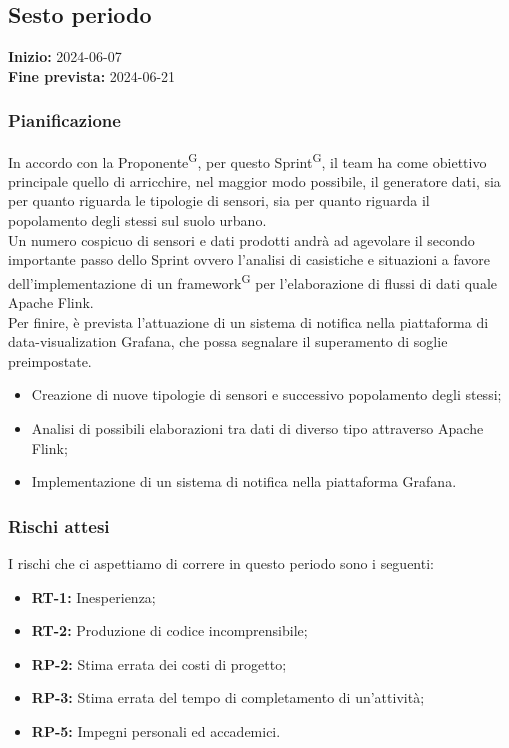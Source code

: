 \documentclass[8pt]{article}
\newcommand{\glossterm}[1]{#1\textsuperscript{G}} %
\begin{document}
\subsection{Sesto periodo} 
\textbf{Inizio:} 2024-06-07\\
\textbf{Fine prevista:} 2024-06-21
\subsubsection{Pianificazione}
In accordo con la \glossterm{Proponente}, per questo \glossterm{Sprint}, il team ha come obiettivo principale quello di arricchire, nel maggior modo possibile, il generatore dati, sia per quanto riguarda le tipologie di sensori, sia per quanto riguarda il popolamento degli stessi sul suolo urbano. \\
Un numero cospicuo di sensori e dati prodotti andrà ad agevolare il secondo importante passo dello Sprint ovvero l'analisi di casistiche e situazioni a favore dell'implementazione di un \glossterm{framework} per l'elaborazione di flussi di dati quale Apache Flink.\\
Per finire, è prevista l'attuazione di un sistema di notifica nella piattaforma di data-visualization Grafana, che possa segnalare il superamento di soglie preimpostate.
\begin{itemize}
    \setlength{\itemsep}{0em}
        \item Creazione di nuove tipologie di sensori e successivo popolamento degli stessi;
        \item Analisi di possibili elaborazioni tra dati di diverso tipo attraverso Apache Flink;
        \item Implementazione di un sistema di notifica nella piattaforma Grafana.
    \end{itemize}

\subsubsection{Rischi attesi}
I rischi che ci aspettiamo di correre in questo periodo sono i seguenti: 
\begin{itemize}
    \setlength{\itemsep}{0em}
        \item \textbf{RT-1:} Inesperienza;
        \item \textbf{RT-2:} Produzione di codice incomprensibile;
        \item \textbf{RP-2:} Stima errata dei costi di progetto;
        \item \textbf{RP-3:} Stima errata del tempo di completamento di un'attività;
        \item \textbf{RP-5:} Impegni personali ed accademici.
\end{itemize}
\clearpage
\end{document}

